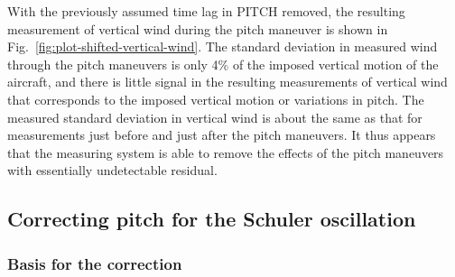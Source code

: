 \documentclass[12pt,twoside,english]{article}\usepackage[]{graphicx}\usepackage[]{color}
\let\stdsection\section
\renewcommand{\section}{\newpage\stdsection}
\let\OrgIndex\index
\renewcommand*{\index}[1]{\OrgIndex{#1}}
\begin{document}
With the previously assumed time lag in PITCH removed, the resulting measurement of vertical wind during the pitch maneuver is shown in Fig.~\ref{fig:plot-shifted-vertical-wind}. The standard deviation in measured wind through the pitch maneuvers is only 4\% of the imposed vertical motion of the aircraft, and
there is little signal in the resulting measurements of vertical wind that corresponds to the imposed vertical motion or variations in pitch. The measured standard deviation in vertical wind is about the same as that for measurements just before and just after the pitch maneuvers. It thus appears that the measuring system is able to remove the effects of the pitch maneuvers with essentially undetectable residual. 
% 



\subsection{Correcting pitch for the Schuler oscillation\label{sub:Schuler}}





% 



\subsubsection{Basis for the correction}
\end{document}
